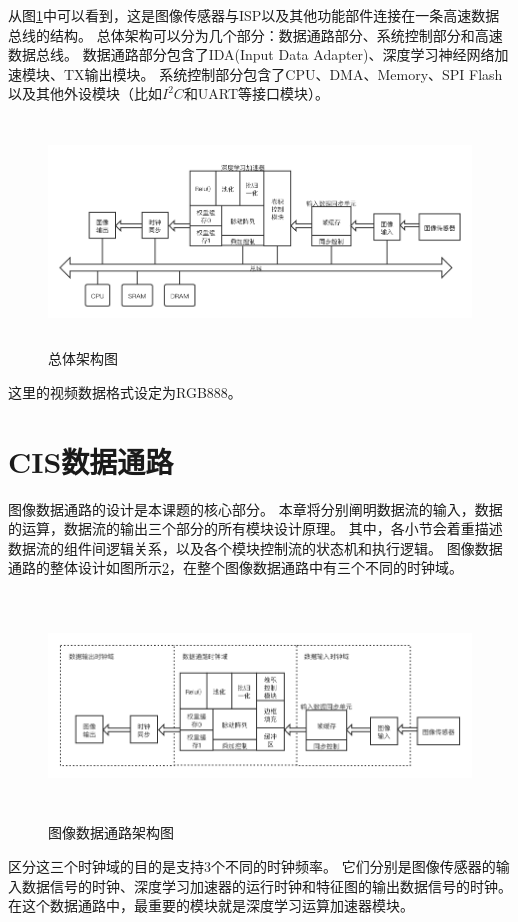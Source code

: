 从图\ref{fig:top_arch}中可以看到，这是图像传感器与ISP以及其他功能部件连接在一条高速数据总线的结构。
总体架构可以分为几个部分：数据通路部分、系统控制部分和高速数据总线。
数据通路部分包含了IDA(Input Data Adapter)、深度学习神经网络加速模块、TX输出模块。
系统控制部分包含了CPU、DMA、Memory、SPI Flash以及其他外设模块（比如$I^2C$和UART等接口模块）。
\begin{figure}[htbp]
    \centering
    \includegraphics[width=15cm,height=6cm]{figures/top_arch.png}
    \caption{总体架构图}
    \label{fig:top_arch}
\end{figure}
这里的视频数据格式设定为RGB888。

\section{CIS数据通路}
图像数据通路的设计是本课题的核心部分。
本章将分别阐明数据流的输入，数据的运算，数据流的输出三个部分的所有模块设计原理。
其中，各小节会着重描述数据流的组件间逻辑关系，以及各个模块控制流的状态机和执行逻辑。
图像数据通路的整体设计如图所示\ref{fig:image_datapath}，在整个图像数据通路中有三个不同的时钟域。
\begin{figure}[htbp]
    \centering
    \includegraphics[width=15cm,height=6cm]{figures/image_datapath.png}
    \caption{图像数据通路架构图}
    \label{fig:image_datapath}
\end{figure}
区分这三个时钟域的目的是支持3个不同的时钟频率。
它们分别是图像传感器的输入数据信号的时钟、深度学习加速器的运行时钟和特征图的输出数据信号的时钟。
在这个数据通路中，最重要的模块就是深度学习运算加速器模块。


